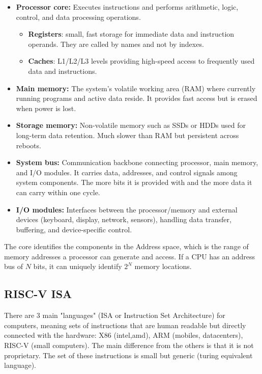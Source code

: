 \begin{itemize}
    \item \textbf{Processor core:} Executes instructions and performs arithmetic, logic, control, and data processing operations.  
        \begin{itemize}
            \item \textbf{Registers}: small, fast storage for immediate data and instruction operands. They are called by names and not by indexes.
            \item \textbf{Caches}: L1/L2/L3 levels providing high-speed access to frequently used data and instructions.
        \end{itemize}

    \item \textbf{Main memory:} The system’s volatile working area (RAM) where currently running programs and active data reside. It provides fast access but is erased when power is lost.

    \item \textbf{Storage memory:} Non-volatile memory such as SSDs or HDDs used for long-term data retention. Much slower than RAM but persistent across reboots.

    \item \textbf{System bus:} Communication backbone connecting processor, main memory, and I/O modules. It carries data, addresses, and control signals among system components. The more bits it is provided with and the more data it can carry within one cycle.

    \item \textbf{I/O modules:} Interfaces between the processor/memory and external devices (keyboard, display, network, sensors), handling data transfer, buffering, and device-specific control.
\end{itemize}

The core identifies the components in the Address space, which is the range of memory addresses a processor can generate and access.
If a CPU has an address bus of $N$ bits, it can uniquely identify $2^N$ memory locations.

\subsection{RISC-V ISA}
There are 3 main "languages" (ISA or Instruction Set Architecture) for computers, meaning sets of instructions that are human readable but directly connected with the hardware: X86 (intel,amd), ARM (mobiles, datacenters), RISC-V (small computers). The main difference from the others is that it is not proprietary. The set of these instructions is small but generic (turing equivalent language).


